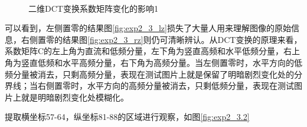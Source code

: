 \documentclass[10pt, a4paper]{article}
\begin{document}
\begin{figure}[htb!]
    \centering
    \qquad
    \\
    \qquad
    \caption{二维DCT变换系数矩阵变化的影响1}
    \label{fig:exp2_3.1}
\end{figure}

可以看到，左侧置零的结果图\ref{fig:exp2_3_lz}损失了大量人用来理解图像的原始信息，右侧置零的结果图\ref{fig:exp2_3_rz}则仍可清晰辨认。从DCT变换的原理来看，系数矩阵C的左上角为直流和低频分量，左下角为竖直高频和水平低频分量，右上角为竖直低频和水平高频分量，右下角为高频分量。当左侧置零时，水平方向的低频分量被消去，只剩高频分量，表现在测试图片上就是保留了明暗剧烈变化处的分界线；当右侧置零时，水平方向的高频分量被消去，只剩低频分量，表现在测试图片上就是明暗剧烈变化处模糊化。

提取横坐标57-64，纵坐标81-88的区域进行观察，如图\ref{fig:exp2_3.2}
\end{document}
